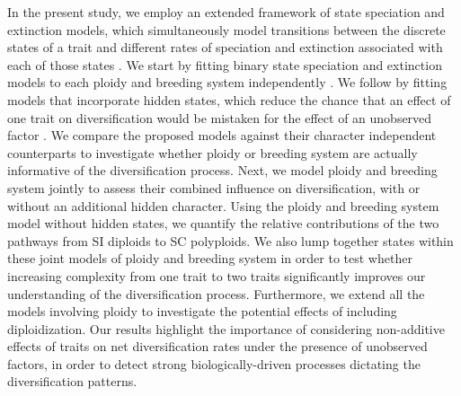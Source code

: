 In the present study, we employ an extended framework of state speciation and extinction models, which simultaneously model transitions between the discrete states of a trait and different rates of speciation and extinction associated with each of those states \citep[`SSE' models;][]{maddison_2007, fitzjohn_2012}.
We start by fitting binary state speciation and extinction models to each ploidy and breeding system independently \citep{maddison_2007}.
We follow by fitting models that incorporate hidden states, which reduce the chance that an effect of one trait on diversification would be mistaken for the effect of an unobserved factor \citep{beaulieu_2016}.
We compare the proposed models against their character independent counterparts \citep{beaulieu_2016} to investigate whether ploidy or breeding system are actually informative of the diversification process.
Next, we model ploidy and breeding system jointly to assess their combined influence on diversification, with or without an additional hidden character.
Using the ploidy and breeding system model without hidden states, we quantify the relative contributions of the two pathways from SI diploids to SC polyploids.
We also lump together states within these joint models of ploidy and breeding system in order to test whether increasing complexity from one trait to two traits significantly improves our understanding of the diversification process.
Furthermore, we extend all the models involving ploidy to investigate the potential effects of including diploidization.
Our results highlight the importance of considering non-additive effects of traits on net diversification rates  under the presence of unobserved factors, in order to detect strong biologically-driven processes dictating the diversification patterns.
